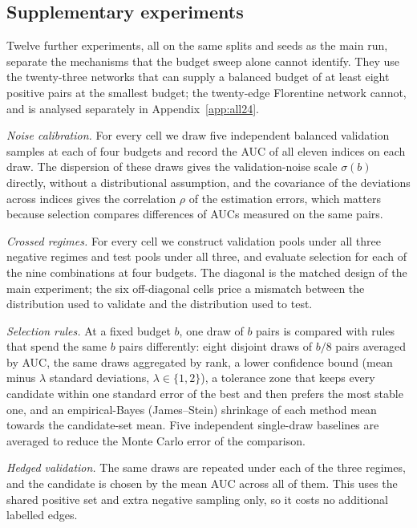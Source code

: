 \documentclass{comjnl}
\begin{document}
\subsection{Supplementary experiments}
\label{sec:supp}

Twelve further experiments, all on the same splits and seeds as the main run, separate the mechanisms that the budget sweep alone cannot identify. They use the twenty-three networks that can supply a balanced budget of at least eight positive pairs at the smallest budget; the twenty-edge Florentine network cannot, and is analysed separately in Appendix~\ref{app:all24}.

\emph{Noise calibration.} For every cell we draw five independent balanced validation samples at each of four budgets and record the AUC of all eleven indices on each draw. The dispersion of these draws gives the validation-noise scale $\sigma(b)$ directly, without a distributional assumption, and the covariance of the deviations across indices gives the correlation $\rho$ of the estimation errors, which matters because selection compares differences of AUCs measured on the same pairs.

\emph{Crossed regimes.} For every cell we construct validation pools under all three negative regimes and test pools under all three, and evaluate selection for each of the nine combinations at four budgets. The diagonal is the matched design of the main experiment; the six off-diagonal cells price a mismatch between the distribution used to validate and the distribution used to test.

\emph{Selection rules.} At a fixed budget $b$, one draw of $b$ pairs is compared with rules that spend the same $b$ pairs differently: eight disjoint draws of $b/8$ pairs averaged by AUC, the same draws aggregated by rank, a lower confidence bound (mean minus $\lambda$ standard deviations, $\lambda\in\{1,2\}$), a tolerance zone that keeps every candidate within one standard error of the best and then prefers the most stable one, and an empirical-Bayes (James--Stein) shrinkage of each method mean towards the candidate-set mean. Five independent single-draw baselines are averaged to reduce the Monte Carlo error of the comparison.

\emph{Hedged validation.} The same draws are repeated under each of the three regimes, and the candidate is chosen by the mean AUC across all of them. This uses the shared positive set and extra negative sampling only, so it costs no additional labelled edges.
\end{document}
